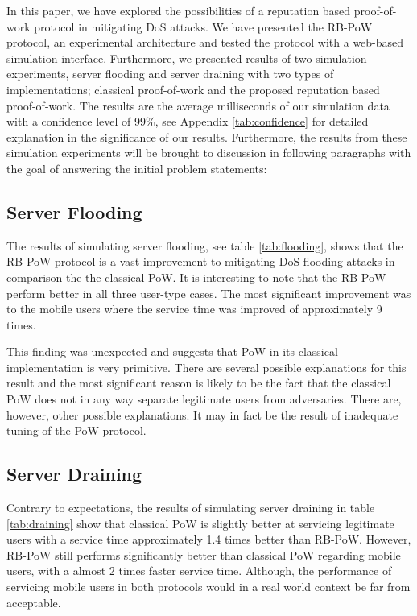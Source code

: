 In this paper, we have explored the possibilities of a reputation based proof-of-work protocol in mitigating DoS attacks. We have presented the RB-PoW protocol, an experimental architecture and tested the protocol with a web-based simulation interface. Furthermore, we presented results of two simulation experiments, server flooding and server draining with two types of implementations; classical proof-of-work and the proposed reputation based proof-of-work. The results are the average milliseconds of our simulation data with a confidence level of 99\%, see Appendix \ref{tab:confidence} for detailed explanation in the significance of our results. Furthermore, the results from these simulation experiments will be brought to discussion in following paragraphs with the goal of answering the initial problem statements:

\subsection{Server Flooding}
The results of simulating server flooding, see table \ref{tab:flooding}, shows that the RB-PoW protocol is a vast improvement to mitigating DoS flooding attacks in comparison the the classical PoW. It is interesting to note that the RB-PoW perform better in all three user-type cases. The most significant improvement was to the mobile users where the service time was improved of approximately 9 times. 

This finding was unexpected and suggests that PoW in its classical implementation is very primitive.
There are several possible explanations for this result and the most significant reason is likely to be the fact that the classical PoW does not in any way separate legitimate users from adversaries.
There are, however, other possible explanations. It may in fact be the result of inadequate tuning of the PoW protocol. 

\subsection{Server Draining}

Contrary to expectations, the results of simulating server draining in table \ref{tab:draining} show that classical PoW is slightly better at servicing legitimate users with a service time approximately 1.4 times better than RB-PoW. However, RB-PoW still performs significantly better than classical PoW regarding mobile users, with a almost 2 times faster service time. Although, the performance of servicing mobile users in both protocols would in a real world context be far from acceptable.

